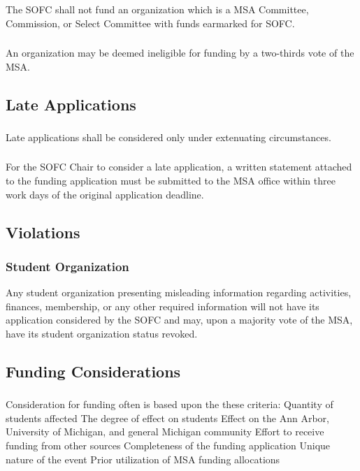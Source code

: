 \subsubsection{}
The SOFC shall not fund an organization which is a MSA Committee, Commission, or Select Committee with funds earmarked for SOFC. 
\subsubsection{}
An organization may be deemed ineligible for funding by a two-thirds vote of the MSA.

\subsection{Late Applications}
\subsubsection{}
Late applications shall be considered only under extenuating circumstances.
\subsubsection{}
For the SOFC Chair to consider a late application, a written statement attached to the funding application must be submitted to the MSA office within three work days of the original application deadline.

\subsection{Violations}
\subsubsection{Student Organization}
\subsubsubsection{}
Any student organization presenting misleading information regarding activities, finances, membership, or any other required information will not have its application considered by the SOFC and may, upon a majority vote of the MSA, have its student organization status revoked. 

\subsection{Funding Considerations}
\subsubsection{}
Consideration for funding often is based upon the these criteria:
\subsubsubsection{}
Quantity of students affected
\subsubsubsection{}
The degree of effect on students
\subsubsubsection{}
Effect on the Ann Arbor, University of Michigan, and general Michigan community
\subsubsubsection{}
Effort to receive funding from other sources
\subsubsubsection{}
Completeness of the funding application
\subsubsubsection{}
Unique nature of the event
\subsubsubsection{}
Prior utilization of MSA funding allocations
